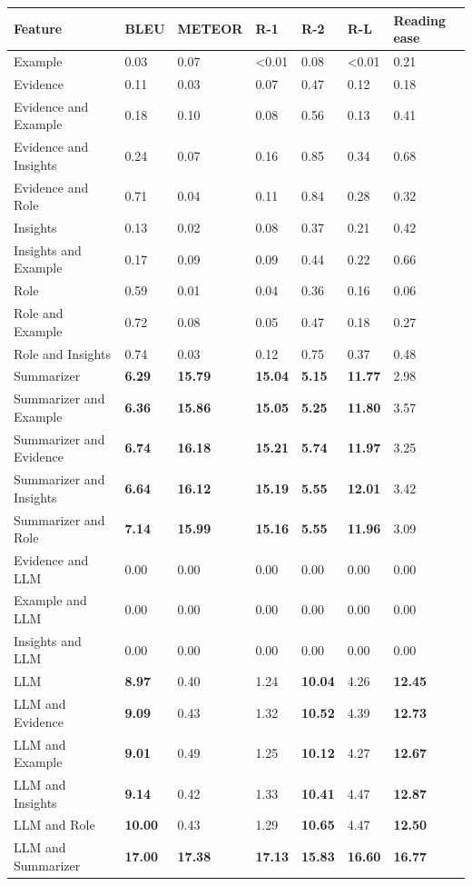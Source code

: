 \begin{tabular}{|l|l|l|l|l|l|l|}
\hline
\textbf{Feature} & BLEU & METEOR & R-1 & R-2 & R-L & Reading ease \\
 \hline
 Example & 0.03 & 0.07 & \textless{}0.01 & 0.08 & \textless{}0.01 & 0.21 \\
 \hline
 Evidence & 0.11 & 0.03 & 0.07 & 0.47 & 0.12 & 0.18 \\
 \hline
 Evidence and Example & 0.18 & 0.10 & 0.08 & 0.56 & 0.13 & 0.41 \\
 \hline
 Evidence and Insights & 0.24 & 0.07 & 0.16 & 0.85 & 0.34 & 0.68 \\
 \hline
 Evidence and Role & 0.71 & 0.04 & 0.11 & 0.84 & 0.28 & 0.32 \\
 \hline
 Insights & 0.13 & 0.02 & 0.08 & 0.37 & 0.21 & 0.42 \\
 \hline
 Insights and Example & 0.17 & 0.09 & 0.09 & 0.44 & 0.22 & 0.66 \\
 \hline
 Role & 0.59 & 0.01 & 0.04 & 0.36 & 0.16 & 0.06 \\
 \hline
 Role and Example & 0.72 & 0.08 & 0.05 & 0.47 & 0.18 & 0.27 \\
 \hline
 Role and Insights & 0.74 & 0.03 & 0.12 & 0.75 & 0.37 & 0.48 \\
 \hline
 Summarizer & \textbf{6.29} & \textbf{15.79} & \textbf{15.04} & \textbf{5.15} & \textbf{11.77} & 2.98 \\
 \hline
 Summarizer and Example & \textbf{6.36} & \textbf{15.86} & \textbf{15.05} & \textbf{5.25} & \textbf{11.80} & 3.57 \\
 \hline
 Summarizer and Evidence & \textbf{6.74} & \textbf{16.18} & \textbf{15.21} & \textbf{5.74} & \textbf{11.97} & 3.25 \\
 \hline
 Summarizer and Insights & \textbf{6.64} & \textbf{16.12} & \textbf{15.19} & \textbf{5.55} & \textbf{12.01} & 3.42 \\
 \hline
 Summarizer and Role & \textbf{7.14} & \textbf{15.99} & \textbf{15.16} & \textbf{5.55} & \textbf{11.96} & 3.09 \\
 \hline
 Evidence and LLM & 0.00 & 0.00 & 0.00 & 0.00 & 0.00 & 0.00 \\
 \hline
 Example and LLM & 0.00 & 0.00 & 0.00 & 0.00 & 0.00 & 0.00 \\
 \hline
 Insights and LLM & 0.00 & 0.00 & 0.00 & 0.00 & 0.00 & 0.00 \\
 \hline
 LLM & \textbf{8.97} & 0.40 & 1.24 & \textbf{10.04} & 4.26 & \textbf{12.45} \\
 \hline
 LLM and Evidence & \textbf{9.09} & 0.43 & 1.32 & \textbf{10.52} & 4.39 & \textbf{12.73} \\
 \hline
 LLM and Example & \textbf{9.01} & 0.49 & 1.25 & \textbf{10.12} & 4.27 & \textbf{12.67} \\
 \hline
 LLM and Insights & \textbf{9.14} & 0.42 & 1.33 & \textbf{10.41} & 4.47 & \textbf{12.87} \\
 \hline
 LLM and Role & \textbf{10.00} & 0.43 & 1.29 & \textbf{10.65} & 4.47 & \textbf{12.50} \\
 \hline
 LLM and Summarizer & \textbf{17.00} & \textbf{17.38} & \textbf{17.13} & \textbf{15.83} & \textbf{16.60} & \textbf{16.77} \\
\hline
\end{tabular}
